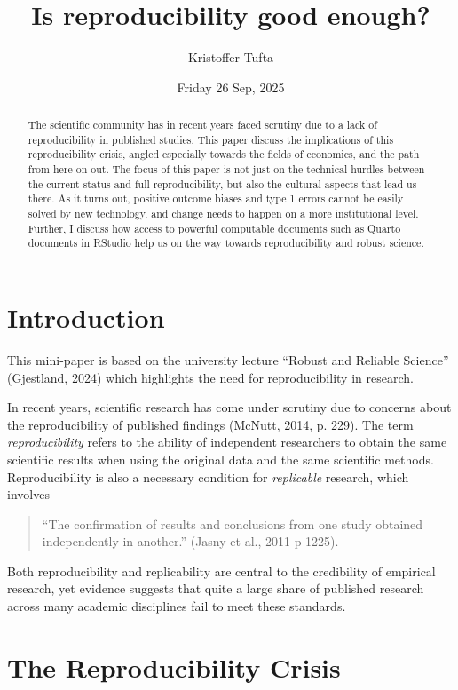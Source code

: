 \documentclass[
  a4paper,
]{article}
\title{Is reproducibility good enough?}
\author{Kristoffer Tufta}
\date{Friday 26 Sep, 2025}
\begin{document}
\maketitle
\begin{abstract}
The scientific community has in recent years faced scrutiny due to a
lack of reproducibility in published studies. This paper discuss the
implications of this reproducibility crisis, angled especially towards
the fields of economics, and the path from here on out. The focus of
this paper is not just on the technical hurdles between the current
status and full reproducibility, but also the cultural aspects that lead
us there. As it turns out, positive outcome biases and type 1 errors
cannot be easily solved by new technology, and change needs to happen on
a more institutional level. Further, I discuss how access to powerful
computable documents such as Quarto documents in RStudio help us on the
way towards reproducibility and robust science.
\end{abstract}


\section{Introduction}\label{introduction}

This mini-paper is based on the university lecture ``Robust and Reliable
Science'' (Gjestland, 2024) which highlights the need for
reproducibility in research.

In recent years, scientific research has come under scrutiny due to
concerns about the reproducibility of published findings (McNutt, 2014,
p. 229). The term \emph{reproducibility} refers to the ability of
independent researchers to obtain the same scientific results when using
the original data and the same scientific methods. Reproducibility is
also a necessary condition for \emph{replicable} research, which
involves

\begin{quote}
``The confirmation of results and conclusions from one study obtained
independently in another.'' (Jasny et al., 2011 p 1225).
\end{quote}

Both reproducibility and replicability are central to the credibility of
empirical research, yet evidence suggests that quite a large share of
published research across many academic disciplines fail to meet these
standards.

\section{The Reproducibility Crisis}\label{the-reproducibility-crisis}
\end{document}
